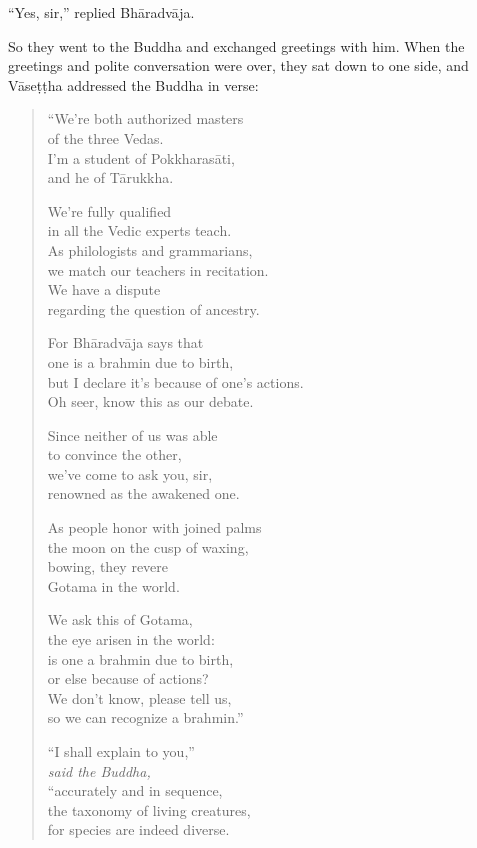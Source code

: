 \documentclass[12pt,openany]{book}%
\newcommand*{\scspeaker}[1]{\hspace{2em}\textit{#1}}
\begin{document}
“Yes, sir,” replied \textsanskrit{Bhāradvāja}. 

So they went to the Buddha and exchanged greetings with him. When the greetings and polite conversation were over, they sat down to one side, and \textsanskrit{Vāseṭṭha} addressed the Buddha in verse: 

\begin{verse}%
“We’re both authorized masters \\
of the three Vedas. \\
I’m a student of \textsanskrit{Pokkharasāti}, \\
and he of \textsanskrit{Tārukkha}. 

We’re fully qualified \\
in all the Vedic experts teach. \\
As philologists and grammarians, \\
we match our teachers in recitation. \\
We have a dispute \\
regarding the question of ancestry. 

For \textsanskrit{Bhāradvāja} says that \\
one is a brahmin due to birth, \\
but I declare it’s because of one’s actions. \\
Oh seer, know this as our debate. 

Since neither of us was able \\
to convince the other, \\
we’ve come to ask you, sir, \\
renowned as the awakened one. 

As people honor with joined palms \\
the moon on the cusp of waxing, \\
bowing, they revere \\
Gotama in the world. 

We ask this of Gotama, \\
the eye arisen in the world: \\
is one a brahmin due to birth, \\
or else because of actions? \\
We don’t know, please tell us, \\
so we can recognize a brahmin.” 

“I shall explain to you,” \\
\scspeaker{said the Buddha, }\\
“accurately and in sequence, \\
the taxonomy of living creatures, \\
for species are indeed diverse. 


\end{verse}
\end{document}
